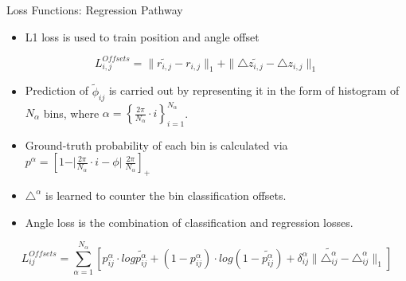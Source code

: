 \documentclass[aspectratio=169]{beamer}
\begin{document}
\begin{frame}{Loss Functions: Regression Pathway}
    \begin{itemize}
        \item L1 loss is used to train position and angle offset
    \end{itemize}
    
    \begin{equation}
                L^{Offsets}_{i,j} = \parallel \widetilde{r_{i,j}} - r_{i,j} \parallel_{1} + \parallel \triangle{\widetilde{z_{i,j}}} - \triangle{z_{i,j}} \parallel_{1} 
     \end{equation}

    \begin{itemize}
        \item Prediction of $\widetilde{\phi}_{ij}$ is carried out by representing it in the form of histogram of $N_{\alpha}$ bins, where $\alpha = \left\{\frac{2\pi}{N_{\alpha} } \cdot i \right\}^{N_{\alpha}}_{i =1} $.
        \item Ground-truth probability of each bin is calculated via $ p^{\alpha} = [1 - \vert \frac{2\pi}{N_{\alpha}} \cdot i  - \phi  \vert \ \frac{2\pi}{N_{\alpha}} ]_{+}$
        \item $\triangle^{\alpha}$ is learned to counter the bin classification offsets.
        \item Angle loss is the combination of classification and regression losses.
    \end{itemize}

    \begin{equation}
                 L_{ij}^{Offsets} = \sum_{\alpha=1}^{N_{\alpha}}[p^{\alpha}_{ij} \cdot log \tilde{p^{\alpha}_{ij}} + (1 - p^{\alpha}_{ij}) \cdot log(1 - \tilde{p^{\alpha}_{ij}}) + \delta^{\alpha}_{ij} \parallel   \tilde{\triangle^{\alpha}_{ij}} - \triangle^{\alpha}_{ij} \parallel_{1} ] 
             \end{equation}
    
\end{frame}
\end{document}
